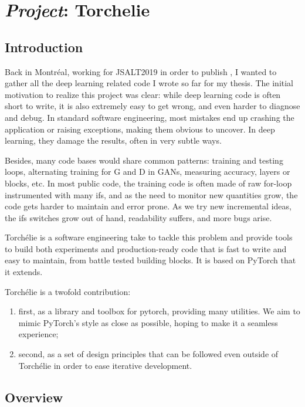 \chapter{\emph{\arr Project}: Torchelie}
\label{chap:tch}

\section{Introduction}

Back in Montréal, working for JSALT2019 in order to publish \cite{jsaltvq}, I wanted to gather all the deep learning related code I wrote so far for my thesis. The initial motivation to realize this project was clear: while deep learning code is often short to write, it is also extremely easy to get wrong, and even harder to diagnose and debug. In standard software engineering, most mistakes end up crashing the application or raising exceptions, making them obvious to uncover. In deep learning, they damage the results, often in very subtle ways.

Besides, many code bases would share common patterns: training and testing loops, alternating training for G and D in \acp{GAN}, measuring accuracy, layers or blocks, etc. In most public code, the training code is often made of raw for-loop instrumented with many ifs, and as the need to monitor new quantities grow, the code gets harder to maintain and error prone. As we try new incremental ideas, the ifs switches grow out of hand, readability suffers, and more bugs arise.

Torchélie is a software engineering take to tackle this problem and provide tools to build both experiments and production-ready code that is fast to write and easy to maintain, from battle tested building blocks. It is based on PyTorch that it extends.

Torchélie is a twofold contribution:
\begin{enumerate}
    \item first, as a library and toolbox for pytorch, providing many utilities. We aim to mimic PyTorch's style as close as possible, hoping to make it a seamless experience;
    \item second, as a set of design principles that can be followed even outside of Torchélie in order to ease iterative development.
\end{enumerate}

\section{Overview}

